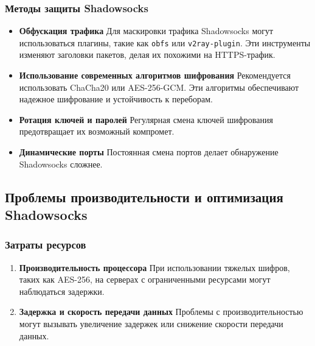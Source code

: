 \documentclass{SCWorks}
\begin{document}
\subsubsection{Методы защиты Shadowsocks}
\begin{itemize}
    \item \textbf{Обфускация трафика}  
    Для маскировки трафика Shadowsocks могут использоваться плагины, такие как \texttt{obfs} или \texttt{v2ray-plugin}. Эти инструменты изменяют заголовки пакетов, делая их похожими на HTTPS-трафик.

    \item \textbf{Использование современных алгоритмов шифрования}  
    Рекомендуется использовать ChaCha20 или AES-256-GCM. Эти алгоритмы обеспечивают надежное шифрование и устойчивость к переборам.

    \item \textbf{Ротация ключей и паролей}  
    Регулярная смена ключей шифрования предотвращает их возможный компромет.

    \item \textbf{Динамические порты}  
    Постоянная смена портов делает обнаружение Shadowsocks сложнее.
\end{itemize}

\subsection{Проблемы производительности и оптимизация Shadowsocks}

\subsubsection{Затраты ресурсов}
\begin{enumerate}
    \item \textbf{Производительность процессора}  
    При использовании тяжелых шифров, таких как AES-256, на серверах с ограниченными ресурсами могут наблюдаться задержки.

    \item \textbf{Задержка и скорость передачи данных}  
    Проблемы с производительностью могут вызывать увеличение задержек или снижение скорости передачи данных.
\end{enumerate}
\end{document}
